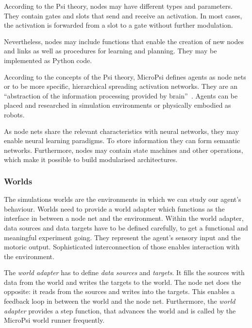 According to the Psi theory, nodes may have different types and parameters. They contain gates and slots that send and receive an activation. In most cases, the activation is forwarded from a slot to a gate without further modulation.

Nevertheless, nodes may include functions that enable the creation of new nodes and links as well as procedures for learning and planning. They may be implemented as Python code.

According to the concepts of the Psi theory, MicroPsi defines agents as node nets or to be more specific, hierarchical spreading activation networks. They are an ``abstraction of the information processing provided by brain''~\cite{conf/agi/Bach12}. Agents can be placed and researched in simulation environments or physically embodied as robots.



As node nets share the relevant characteristics with neural networks, they may enable neural learning paradigms. To store information they can form semantic networks. Furthermore, nodes may contain state machines and other operations, which make it possible to build modularised architectures.

        \subsubsection{Worlds}
        \label{microPsiWorld}
The simulations worlds are the environments in which we can study our agent's behaviour. Worlds need to provide a world adapter which functions as the interface in between a node net and the environment. Within the world adapter, data sources and data targets have to be defined carefully, to get a functional and meaningful experiment going. They represent the agent's sensory input and the motoric output. Sophisticated interconnection of those enables interaction with the environment.

The \emph{world adapter} has to define \emph{data sources} and \emph{targets}. It fills the sources with data from the world and writes the targets to the world. The node net does the opposite: it reads from the sources and writes into the targets. This enables a feedback loop in between the world and the node net. Furthermore, the \emph{world adapter} provides a step function, that advances the world and is called by the MicroPsi world runner frequently.


